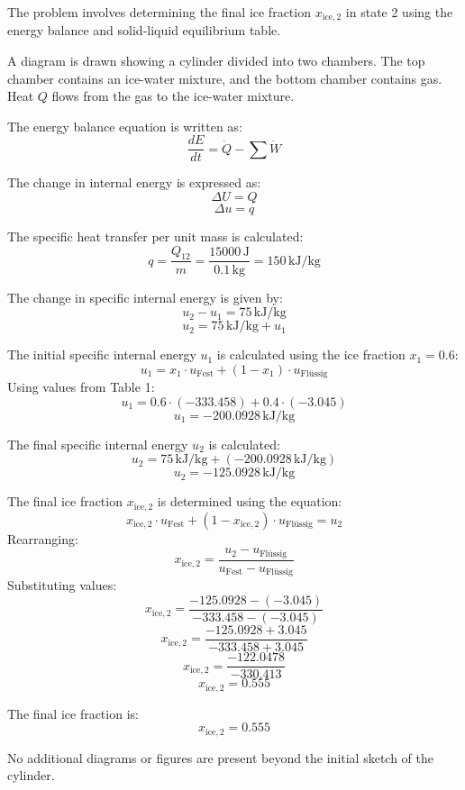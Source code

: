 The problem involves determining the final ice fraction \( x_{\text{ice},2} \) in state 2 using the energy balance and solid-liquid equilibrium table.  

A diagram is drawn showing a cylinder divided into two chambers. The top chamber contains an ice-water mixture, and the bottom chamber contains gas. Heat \( Q \) flows from the gas to the ice-water mixture.  

The energy balance equation is written as:  
\[
\frac{dE}{dt} = \dot{Q} - \sum \dot{W}
\]  

The change in internal energy is expressed as:  
\[
\Delta U = Q
\]  
\[
\Delta u = q
\]  

The specific heat transfer per unit mass is calculated:  
\[
q = \frac{Q_{12}}{m} = \frac{15000 \, \text{J}}{0.1 \, \text{kg}} = 150 \, \text{kJ/kg}
\]  

The change in specific internal energy is given by:  
\[
u_2 - u_1 = 75 \, \text{kJ/kg}
\]  
\[
u_2 = 75 \, \text{kJ/kg} + u_1
\]  

The initial specific internal energy \( u_1 \) is calculated using the ice fraction \( x_1 = 0.6 \):  
\[
u_1 = x_1 \cdot u_{\text{Fest}} + (1 - x_1) \cdot u_{\text{Flüssig}}
\]  
Using values from Table 1:  
\[
u_1 = 0.6 \cdot (-333.458) + 0.4 \cdot (-3.045)
\]  
\[
u_1 = -200.0928 \, \text{kJ/kg}
\]  

The final specific internal energy \( u_2 \) is calculated:  
\[
u_2 = 75 \, \text{kJ/kg} + (-200.0928 \, \text{kJ/kg})
\]  
\[
u_2 = -125.0928 \, \text{kJ/kg}
\]  

The final ice fraction \( x_{\text{ice},2} \) is determined using the equation:  
\[
x_{\text{ice},2} \cdot u_{\text{Fest}} + (1 - x_{\text{ice},2}) \cdot u_{\text{Flüssig}} = u_2
\]  
Rearranging:  
\[
x_{\text{ice},2} = \frac{u_2 - u_{\text{Flüssig}}}{u_{\text{Fest}} - u_{\text{Flüssig}}}
\]  
Substituting values:  
\[
x_{\text{ice},2} = \frac{-125.0928 - (-3.045)}{-333.458 - (-3.045)}
\]  
\[
x_{\text{ice},2} = \frac{-125.0928 + 3.045}{-333.458 + 3.045}
\]  
\[
x_{\text{ice},2} = \frac{-122.0478}{-330.413}
\]  
\[
x_{\text{ice},2} = 0.555
\]  

The final ice fraction is:  
\[
x_{\text{ice},2} = 0.555
\]  

No additional diagrams or figures are present beyond the initial sketch of the cylinder.